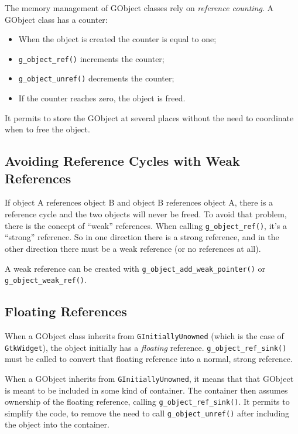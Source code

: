 The memory management of GObject classes rely on \emph{reference counting}. A GObject class has a counter:
\begin{itemize}
  \item When the object is created the counter is equal to one;
  \item \lstinline{g_object_ref()} increments the counter;
  \item \lstinline{g_object_unref()} decrements the counter;
  \item If the counter reaches zero, the object is freed.
\end{itemize}

It permits to store the GObject at several places without the need to coordinate when to free the object.

\subsection{Avoiding Reference Cycles with Weak References}

If object A references object B and object B references object A, there is a reference cycle and the two objects will never be freed. To avoid that problem, there is the concept of ``weak'' references. When calling \lstinline{g_object_ref()}, it's a ``strong'' reference. So in one direction there is a strong reference, and in the other direction there must be a weak reference (or no references at all).

A weak reference can be created with \lstinline{g_object_add_weak_pointer()} or \lstinline{g_object_weak_ref()}.


\subsection{Floating References}

When a GObject class inherits from \lstinline{GInitiallyUnowned} (which is the case of \lstinline{GtkWidget}), the object initially has a \emph{floating} reference. \lstinline{g_object_ref_sink()} must be called to convert that floating reference into a normal, strong reference.

When a GObject inherits from \lstinline{GInitiallyUnowned}, it means that that GObject is meant to be included in some kind of container. The container then assumes ownership of the floating reference, calling \lstinline{g_object_ref_sink()}. It permits to simplify the code, to remove the need to call \lstinline{g_object_unref()} after including the object into the container.

